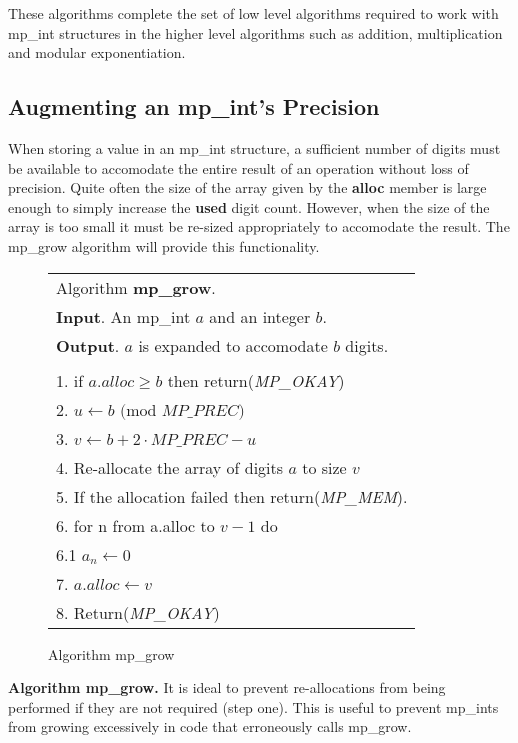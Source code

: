 \documentclass[b5paper]{book}
\begin{document}
These algorithms complete the set of low level algorithms required to work with mp\_int structures in the higher level
algorithms such as addition, multiplication and modular exponentiation.

\subsection{Augmenting an mp\_int's Precision}
When storing a value in an mp\_int structure, a sufficient number of digits must be available to accomodate the entire 
result of an operation without loss of precision.  Quite often the size of the array given by the \textbf{alloc} member 
is large enough to simply increase the \textbf{used} digit count.  However, when the size of the array is too small it 
must be re-sized appropriately to accomodate the result.  The mp\_grow algorithm will provide this functionality.

\newpage\begin{figure}[here]
\begin{center}
\begin{tabular}{l}
\hline Algorithm \textbf{mp\_grow}. \\
\textbf{Input}.   An mp\_int $a$ and an integer $b$. \\
\textbf{Output}.  $a$ is expanded to accomodate $b$ digits. \\
\hline \\
1.  if $a.alloc \ge b$ then return(\textit{MP\_OKAY}) \\
2.  $u \leftarrow b\mbox{ (mod }MP\_PREC\mbox{)}$ \\
3.  $v \leftarrow b + 2 \cdot MP\_PREC - u$ \\
4.  Re-allocate the array of digits $a$ to size $v$ \\
5.  If the allocation failed then return(\textit{MP\_MEM}). \\
6.  for n from a.alloc to $v - 1$ do  \\
\hspace{+3mm}6.1  $a_n \leftarrow 0$ \\
7.  $a.alloc \leftarrow v$ \\
8.  Return(\textit{MP\_OKAY}) \\
\hline
\end{tabular}
\end{center}
\caption{Algorithm mp\_grow}
\end{figure}

\textbf{Algorithm mp\_grow.}
It is ideal to prevent re-allocations from being performed if they are not required (step one).  This is useful to 
prevent mp\_ints from growing excessively in code that erroneously calls mp\_grow.  
\end{document}
